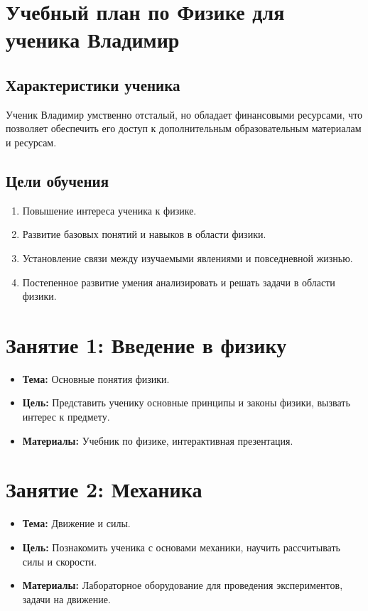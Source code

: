 \documentclass{article}
\begin{document}
\section*{Учебный план по Физике для ученика Владимир}

\subsection*{Характеристики ученика}
Ученик Владимир умственно отсталый, но обладает финансовыми ресурсами, что позволяет обеспечить его доступ к дополнительным образовательным материалам и ресурсам.

\subsection*{Цели обучения}
\begin{enumerate}[label=\arabic*.]
    \item Повышение интереса ученика к физике.
    \item Развитие базовых понятий и навыков в области физики.
    \item Установление связи между изучаемыми явлениями и повседневной жизнью.
    \item Постепенное развитие умения анализировать и решать задачи в области физики.
\end{enumerate}

\section{Занятие 1: Введение в физику}
\begin{itemize}
    \item \textbf{Тема:} Основные понятия физики.
    \item \textbf{Цель:} Представить ученику основные принципы и законы физики, вызвать интерес к предмету.
    \item \textbf{Материалы:} Учебник по физике, интерактивная презентация.
\end{itemize}

\section{Занятие 2: Механика}
\begin{itemize}
    \item \textbf{Тема:} Движение и силы.
    \item \textbf{Цель:} Познакомить ученика с основами механики, научить рассчитывать силы и скорости.
    \item \textbf{Материалы:} Лабораторное оборудование для проведения экспериментов, задачи на движение.
\end{itemize}
\end{document}
